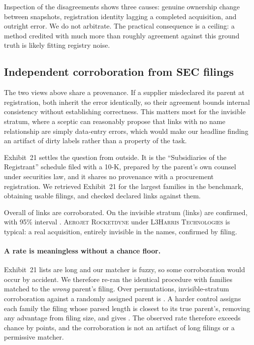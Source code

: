 Inspection of the disagreements shows three causes: genuine ownership change between
snapshots, registration identity lagging a completed acquisition, and outright error. We
do not arbitrate. The practical consequence is a ceiling: a method credited with much
more than roughly \ReconAgreeName agreement against this ground truth is likely fitting
registry noise.

\subsection{Independent corroboration from SEC filings}
\label{sec:edgar}

The two views above share a provenance. If a supplier misdeclared its parent at
registration, both inherit the error identically, so their agreement bounds internal
consistency without establishing correctness. This matters most for the invisible
stratum, where a sceptic can reasonably propose that links with no name relationship are
simply data-entry errors, which would make our headline finding an artifact of dirty
labels rather than a property of the task.

Exhibit~21 settles the question from outside. It is the ``Subsidiaries of the
Registrant'' schedule filed with a 10-K, prepared by the parent's own counsel under
securities law, and it shares no provenance with a procurement registration. We retrieved
Exhibit~21 for the largest families in the benchmark, obtaining \EdgarFilings usable
filings, and checked \EdgarLinks declared links against them.



Overall \EdgarConfirmPct of links are corroborated. On the invisible stratum
(\EdgarInvisibleChecked links) \EdgarInvisibleConfirmPct are confirmed, with 95\%
interval \EdgarInvisibleCI. \textsc{Aerojet Rocketdyne} under \textsc{L3Harris
Technologies} is typical: a real acquisition, entirely invisible in the names, confirmed
by filing.

\paragraph{A rate is meaningless without a chance floor.} Exhibit~21 lists are long and
our matcher is fuzzy, so some corroboration would occur by accident. We therefore re-ran
the identical procedure with families matched to the \emph{wrong} parent's filing. Over
\EdgarPermutations permutations, invisible-stratum corroboration against a randomly
assigned parent is \EdgarRandomParentPct. A harder control assigns each family the
filing whose parsed length is closest to its true parent's, removing any advantage from
filing size, and gives \EdgarNearestSizePct. The observed rate therefore exceeds
chance by \EdgarExcessOverChance points, and the corroboration is not an artifact of
long filings or a permissive matcher.

